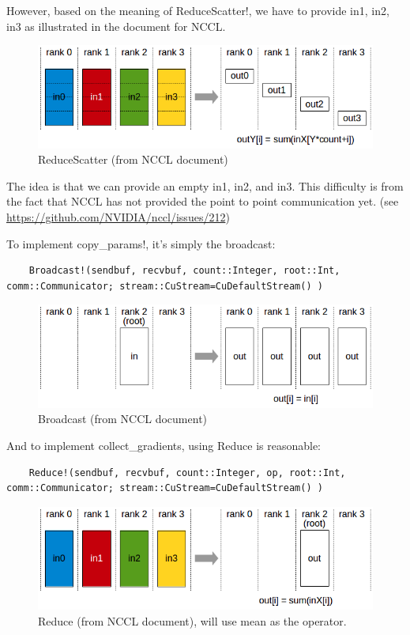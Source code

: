 \documentclass[12pt]{extarticle}
\begin{document}
However, based on the meaning of ReduceScatter!, we have to provide in1, in2, in3 as illustrated in the document for NCCL.
\begin{figure}[ht]
    \centering
         \includegraphics[width=1.0\textwidth]{reducescatter}
          \caption{ReduceScatter (from NCCL document)}
\end{figure}
The idea is that we can provide an empty in1, in2, and in3. This difficulty is from the fact that NCCL has not provided 
the point to point communication yet. (see \url{https://github.com/NVIDIA/nccl/issues/212})

To implement copy\_params!, it's simply the broadcast:
\begin{verbatim}
    Broadcast!(sendbuf, recvbuf, count::Integer, root::Int, comm::Communicator; stream::CuStream=CuDefaultStream() )
\end{verbatim}
\begin{figure}[ht]
    \centering
         \includegraphics[width=1.0\textwidth]{broadcast}
          \caption{Broadcast (from NCCL document)}
\end{figure}


And to implement collect\_gradients, using Reduce is reasonable:
\begin{verbatim}
    Reduce!(sendbuf, recvbuf, count::Integer, op, root::Int, comm::Communicator; stream::CuStream=CuDefaultStream() )
\end{verbatim}
\begin{figure}[ht]
    \centering
         \includegraphics[width=1.0\textwidth]{reduce}
          \caption{Reduce (from NCCL document), will use mean as the operator.}
\end{figure}
\end{document}
